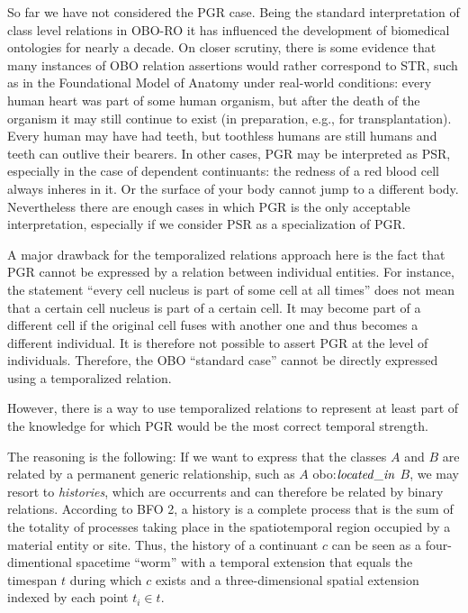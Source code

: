 So far we have not considered the PGR case. Being the standard interpretation of class level 
relations in OBO-RO \cite{OBO:RO} it has influenced the development of biomedical ontologies 
for nearly a decade. On closer scrutiny, there is some evidence that many instances of OBO 
relation assertions would rather correspond to STR, such as in the Foundational Model of Anatomy 
under real-world conditions: every human heart was part of some human organism, but after 
the death of the organism it may still continue to exist (in preparation, e.g., for transplantation). 
Every human may have had teeth, but toothless humans are still humans and teeth can outlive their bearers. 
In other cases, PGR may be interpreted as PSR, especially in the case of dependent continuants: 
the redness of a red blood cell always inheres in it. Or the surface of your body cannot jump to 
a different body. Nevertheless there are enough cases in which PGR is the only acceptable interpretation, 
especially if we consider PSR as a specialization of PGR.

A major drawback for the temporalized relations approach here is the fact that PGR cannot be expressed 
by a relation between individual entities. For instance, the statement ``every cell 
nucleus is part of some cell at all times'' does not mean that a certain cell nucleus is part of a 
certain cell. It may become part of a different cell if the original cell fuses with another one and 
thus becomes a different individual. It is therefore not possible to assert PGR at the level of individuals. 
Therefore, the OBO ``standard case'' cannot be directly expressed using a temporalized relation.

However, there is a way to use temporalized relations to represent at least part of the knowledge 
for which PGR would be the most correct temporal strength.

The reasoning is the following: If we want to express that the classes $A$ and $B$ are related by a 
permanent generic relationship, such as $A$ obo:$\mathit{located\_in}$ $B$, we may resort to 
\emph{histories}, which are occurrents and can therefore be related by binary relations. According 
to BFO 2, a history is a complete process that is the sum of the totality of processes taking place 
in the spatiotemporal region occupied by a material entity or site. Thus, the history of a continuant 
$c$ can be seen as a four-dimentional spacetime ``worm'' with a temporal extension that equals the 
timespan $t$ during which $c$ exists and a three-dimensional spatial extension indexed by each point 
$t_i \in t$. 

